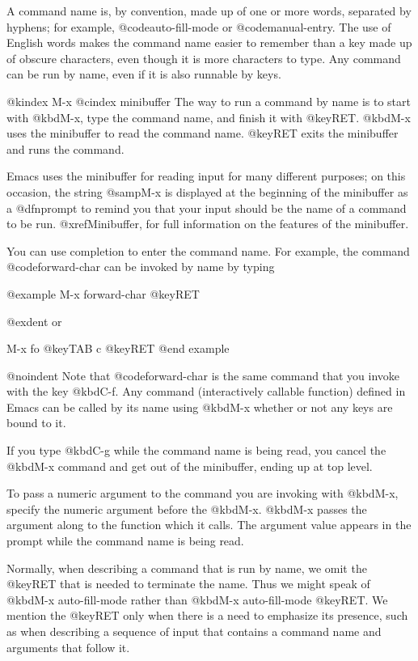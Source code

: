 {{{{{{  A command name is, by convention, made up of one or more words, separated
by hyphens; for example, @code{auto-fill-mode} or @code{manual-entry}.  The
use of English words makes the command name easier to remember than a key
made up of obscure characters, even though it is more characters to type.
Any command can be run by name, even if it is also runnable by keys.

@kindex M-x
@cindex minibuffer
  The way to run a command by name is to start with @kbd{M-x}, type the
command name, and finish it with @key{RET}.  @kbd{M-x} uses the minibuffer
to read the command name.  @key{RET} exits the minibuffer and runs the
command.

  Emacs uses the minibuffer for reading input for many different purposes;
on this occasion, the string @samp{M-x} is displayed at the beginning of
the minibuffer as a @dfn{prompt} to remind you that your input should be
the name of a command to be run.  @xref{Minibuffer}, for full information
on the features of the minibuffer.

  You can use completion to enter the command name.  For example, the
command @code{forward-char} can be invoked by name by typing

@example
M-x forward-char @key{RET}

@exdent or

M-x fo @key{TAB} c @key{RET}
@end example

@noindent
Note that @code{forward-char} is the same command that you invoke with
the key @kbd{C-f}.  Any command (interactively callable function) defined
in Emacs can be called by its name using @kbd{M-x} whether or not any
keys are bound to it.

  If you type @kbd{C-g} while the command name is being read, you cancel
the @kbd{M-x} command and get out of the minibuffer, ending up at top level.

  To pass a numeric argument to the command you are invoking with
@kbd{M-x}, specify the numeric argument before the @kbd{M-x}.  @kbd{M-x}
passes the argument along to the function which it calls.  The argument
value appears in the prompt while the command name is being read.

  Normally, when describing a command that is run by name, we omit the
@key{RET} that is needed to terminate the name.  Thus we might speak of
@kbd{M-x auto-fill-mode} rather than @kbd{M-x auto-fill-mode @key{RET}}.
We mention the @key{RET} only when there is a need to emphasize its
presence, such as when describing a sequence of input that contains a
command name and arguments that follow it.

}}}}}}
